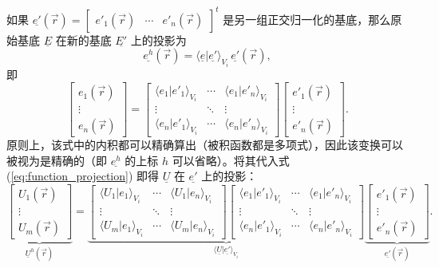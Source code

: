 如果 $\underline{e'}(\vec{r})=\begin{bmatrix}e'_{1}(\vec{r}) & \cdots & e'_{n}(\vec{r})\end{bmatrix}^{t}$
是另一组正交归一化的基底，那么原始基底 $\underline{E}$ 在新的基底 $\underline{E'}$ 上的投影为
\begin{equation}
\underline{e^{h}}(\vec{r})=\langle\underline{e}\vert\underline{e'}\rangle_{V_{i}}\,\underline{e'}(\vec{r}),
\end{equation}
即
\begin{equation}
\begin{bmatrix}e_{1}(\vec{r})\\
\vdots\\
e_{n}(\vec{r})
\end{bmatrix}=\begin{bmatrix}\langle e_{1}\vert e'_{1}\rangle_{V_{i}} & \cdots & \langle e{}_{1}\vert e'_{n}\rangle_{V_{i}}\\
\vdots & \ddots & \vdots\\
\langle e_{n}\vert e'_{1}\rangle_{V_{i}} & \cdots & \langle e_{n}\vert e'_{n}\rangle_{V_{i}}
\end{bmatrix}\begin{bmatrix}e'_{1}(\vec{r})\\
\vdots\\
e'_{n}(\vec{r})
\end{bmatrix}.
\end{equation}
原则上，该式中的内积都可以精确算出（被积函数都是多项式），因此该变换可以被视为是精确的（即 $\underline{e^{h}}$
的上标 $h$ 可以省略）。将其代入式 (\ref{eq:function_projection}) 即得 $\underline{U}$
在 $\underline{e'}$ 上的投影：
\begin{equation}
\underbrace{\begin{bmatrix}U_{1}(\vec{r})\\
\vdots\\
U_{m}(\vec{r})
\end{bmatrix}}_{\underline{U}^{h}(\vec{r})}=\underbrace{\begin{bmatrix}\langle U_{1}\vert e_{1}\rangle_{V_{i}} & \cdots & \langle U_{1}\vert e_{n}\rangle_{V_{i}}\\
\vdots & \ddots & \vdots\\
\langle U_{m}\vert e_{1}\rangle_{V_{i}} & \cdots & \langle U_{m}\vert e_{n}\rangle_{V_{i}}
\end{bmatrix}\begin{bmatrix}\langle e_{1}\vert e'_{1}\rangle_{V_{i}} & \cdots & \langle e_{1}\vert e'_{n}\rangle_{V_{i}}\\
\vdots & \ddots & \vdots\\
\langle e_{n}\vert e'_{1}\rangle_{V_{i}} & \cdots & \langle e_{n}\vert e'_{n}\rangle_{V_{i}}
\end{bmatrix}}_{\langle\underline{U}\vert\underline{e'}\rangle_{V_{i}}}\underbrace{\begin{bmatrix}e'_{1}(\vec{r})\\
\vdots\\
e'_{n}(\vec{r})
\end{bmatrix}}_{\underline{e'}(\vec{r})}.
\end{equation}
